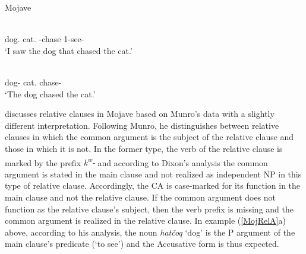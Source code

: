 \enlargethispage{2\baselineskip}
\begin{exe}\ex\label{MojRelA} {Mojave} \citep[188]{Munro:1976}\nopagebreak[4]
\begin{xlist}
\ex\gll  {\rm[}  \textipa{k\super{w}-taver}{\rm]} \\
dog.\acc{} cat.\acc{} \relativ{}-chase 1-see-\tns{}\\
`I saw the dog that chased the cat.'

\ex\gll {}  \\
dog-\nom{} cat.\acc{} chase-\tns{}\\
`The dog chased the cat.'
\end{xlist}
\end{exe}

\citet[333--334]{Dixon:2010-2} discusses relative clauses in Mojave based on Munro's data with a slightly different interpretation. 
Following Munro, he distinguishes between relative clauses in which the common argument is the subject of the relative clause and those in which it is not. 
In the former type, the verb of the relative clause is marked by the prefix \emph{k\textsuperscript{w}-} and according to Dixon's analysis the common argument is stated in the main clause and not realized as independent NP in this type of  relative clause. 
Accordingly, the CA is case-marked for its function in the main clause and not the relative clause. 
If the common argument does not function as the relative clause's subject, then the verb prefix is missing and the common argument is realized in the relative clause. 
In example (\ref{MojRelA}a) above, according to his analysis, the noun \emph{hat\v coq} `dog' is the P argument of  the main clause's predicate (`to see') and the Accusative form is thus expected.  

